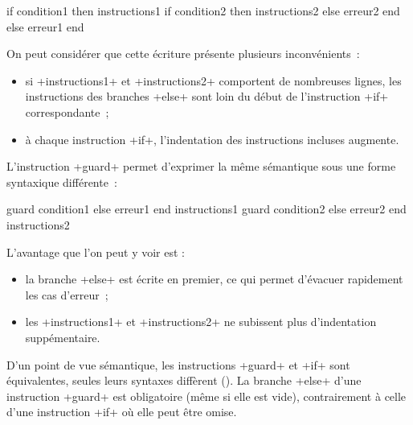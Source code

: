 \begin{galgas34box}
if condition1 then
  instructions1
  if condition2 then
    instructions2
  else
    erreur2
  end
else
  erreur1
end
\end{galgas34box}

On peut considérer que cette écriture présente plusieurs inconvénients~:
\begin{itemize}
  \item si \ggsq+instructions1+ et \ggsq+instructions2+ comportent de nombreuses lignes, les instructions des branches \ggsq+else+ sont loin du début de l'instruction \ggsq+if+ correspondante~;
  \item à chaque instruction \ggsq+if+, l'indentation des instructions incluses augmente.
\end{itemize}

L'instruction \ggsq+guard+ permet d'exprimer la même sémantique sous une forme syntaxique différente~:

\begin{galgas34box}
guard condition1 else
  erreur1
end
instructions1
guard condition2 else
  erreur2
end
instructions2
\end{galgas34box}

L'avantage que l'on peut y voir est :
\begin{itemize}
  \item la branche \ggsq+else+ est écrite en premier, ce qui permet d'évacuer rapidement les cas d'erreur~;
  \item les \ggsq+instructions1+ et \ggsq+instructions2+ ne subissent plus d'indentation suppémentaire.
\end{itemize}

D'un point de vue sémantique, les instructions \ggsq+guard+ et \ggsq+if+ sont équivalentes, seules leurs syntaxes diffèrent (). La branche \ggsq+else+ d'une instruction \ggsq+guard+ est obligatoire (même si elle est vide), contrairement à celle d'une instruction \ggsq+if+ où elle peut être omise.


